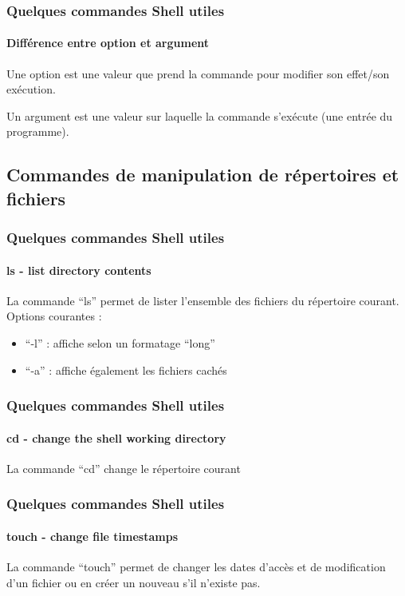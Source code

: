 \documentclass{beamer}
\begin{document}
       \begin{frame}
            \frametitle{Quelques commandes Shell utiles}
            \framesubtitle{Différence entre option et argument}
            Une option est une valeur que prend la commande pour modifier son effet/son exécution.
            
            Un argument est une valeur sur laquelle la commande s'exécute (une entrée du programme).       
        \end{frame}
    
        \subsection[Commandes de manipulation de répertoires et fichiers]{Commandes de manipulation de répertoires et fichiers}
    
            \begin{frame}
                \frametitle{Quelques commandes Shell utiles}
                \framesubtitle{ls - list directory contents}
                La commande \foreignquote{french}{ls} permet de lister l'ensemble des fichiers du répertoire courant.
                Options courantes :
                \begin{itemize}
                    \item \foreignquote{french}{-l} : affiche selon un formatage \foreignquote{french}{long}
                    \item \foreignquote{french}{-a} : affiche également les fichiers cachés
                \end{itemize}
            \end{frame}
            
            \begin{frame}
                \frametitle{Quelques commandes Shell utiles}
                \framesubtitle{cd - change the shell working directory}
                La commande \foreignquote{french}{cd} change le répertoire courant
            \end{frame}
        
            \begin{frame}
                \frametitle{Quelques commandes Shell utiles}
                \framesubtitle{touch - change file timestamps}
                La commande \foreignquote{french}{touch} permet de changer les dates d'accès et de modification d'un fichier ou en créer un nouveau s'il n'existe pas.
            \end{frame}
         
\end{document}
